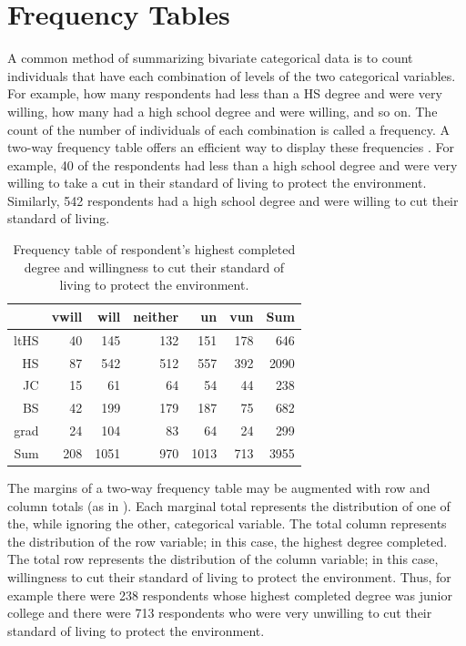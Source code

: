 \documentclass[10pt,openany]{book}\usepackage[]{graphicx}\usepackage[]{color}
\begin{document}


\newpage
\section{Frequency Tables}
\vspace{-6pt}

A common method of summarizing bivariate categorical data is to count individuals that have each combination of levels of the two categorical variables. For example, how many respondents had less than a HS degree and were very willing, how many had a high school degree and were willing, and so on. The count of the number of individuals of each combination is called a frequency. A two-way frequency table offers an efficient way to display these frequencies . For example, 40 of the respondents had less than a high school degree and were very willing to take a cut in their standard of living to protect the environment. Similarly, 542 respondents had a high school degree and were willing to cut their standard of living.

\begin{table}[ht]
\centering
\caption{Frequency table of respondent's highest completed degree and willingness to cut their standard of living to protect the environment.} 
\label{tab:EnvFreq}
\begin{tabular}{rrrrrrr}
  \hline
 & vwill & will & neither & un & vun & Sum \\ 
  \hline
ltHS & 40 & 145 & 132 & 151 & 178 & 646 \\ 
  HS & 87 & 542 & 512 & 557 & 392 & 2090 \\ 
  JC & 15 & 61 & 64 & 54 & 44 & 238 \\ 
  BS & 42 & 199 & 179 & 187 & 75 & 682 \\ 
  grad & 24 & 104 & 83 & 64 & 24 & 299 \\ 
  Sum & 208 & 1051 & 970 & 1013 & 713 & 3955 \\ 
   \hline
\end{tabular}
\end{table}


The margins of a two-way frequency table may be augmented with row and column totals (as in ). Each marginal total represents the distribution of one of the, while ignoring the other, categorical variable. The total column represents the distribution of the row variable; in this case, the highest degree completed. The total row represents the distribution of the column variable; in this case, willingness to cut their standard of living to protect the environment. Thus, for example there were 238 respondents whose highest completed degree was junior college and there were 713 respondents who were very unwilling to cut their standard of living to protect the environment.
\end{document}
